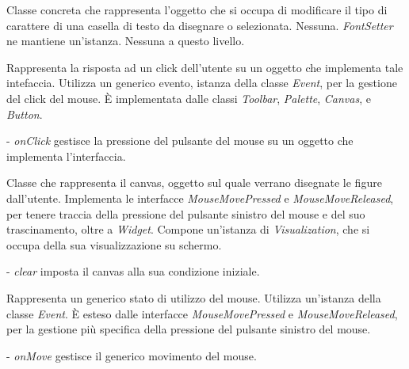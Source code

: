 Classe concreta che rappresenta l'oggetto che si occupa di modificare il tipo di carattere di una casella di testo da disegnare o selezionata.
Nessuna.
\textit{FontSetter} ne mantiene un'istanza.
Nessuna a questo livello.

Rappresenta la risposta ad un click dell'utente su un oggetto che implementa tale intefaccia.
Utilizza un generico evento, istanza della classe \textit{Event}, per la gestione del click del mouse.
\`E implementata dalle classi \textit{Toolbar}, \textit{Palette}, \textit{Canvas}, e \textit{Button}. 
\begin{elencopuntato}[\normindent]
\item[-]  \textit{onClick} gestisce la pressione del pulsante del mouse su un oggetto che implementa l'interfaccia.
\end{elencopuntato}

Classe che rappresenta il canvas, oggetto sul quale verrano disegnate le figure dall'utente.
Implementa le interfacce \textit{MouseMovePressed} e \textit{MouseMoveReleased}, per tenere traccia della pressione del pulsante sinistro del mouse e del suo trascinamento, oltre a \textit{Widget}.
Compone un'istanza di \textit{Visualization}, che si occupa della sua visualizzazione su schermo.
\begin{elencopuntato}[\normindent]
\item[-]  \textit{clear} imposta il canvas alla sua condizione iniziale.
\end{elencopuntato}

Rappresenta un generico stato di utilizzo del mouse.
Utilizza un'istanza della classe \textit{Event}.
\` E esteso dalle interfacce \textit{MouseMovePressed} e \textit{MouseMoveReleased}, per la gestione pi\` u specifica della pressione del pulsante sinistro del mouse.
\begin{elencopuntato}[\normindent]
\item[-]  \textit{onMove} gestisce il generico movimento del mouse.
\end{elencopuntato}

